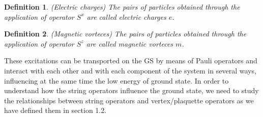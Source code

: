 \documentclass{Configuration_Files/PoliMi3i_thesis}
\newtheorem{definition}{Definition}[chapter]
\begin{document}
\begin{definition}(Electric charges)
	The pairs of particles obtained through the application of operator $S^x$ are called electric charges $e$.
\end{definition}

\begin{definition}(Magnetic vorteces)
	The pairs of particles obtained through the application of operator $S^z$ are called magnetic vorteces $m$.
\end{definition}

These excitations can be transported on the GS by means of Pauli operators and interact with each other and with each component of the system in several ways, influencing at the same time the low energy of ground state.\newline
In order to understand how the string operators influence the ground state, we need to study the relationships between string operators and vertex/plaquette operators as we have defined them in section 1.2.\newline
\end{document}
